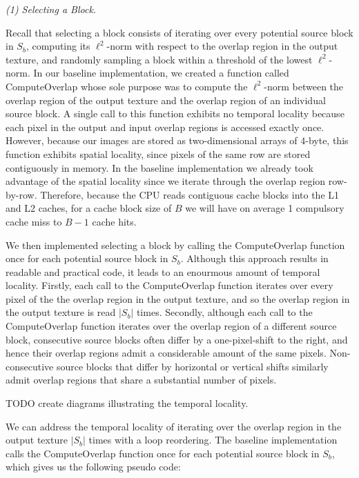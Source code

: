 \documentclass[letterpaper]{article}
\newcommand{\inline}[1]{{\ttfamily\hyphenchar\font=45 #1}}
\begin{document}
\textit{(1) Selecting a Block.}

Recall that selecting a block consists of iterating over every potential source block in $S_b$, computing its $\ell ^2$-norm with respect to the overlap region in the output texture, and randomly sampling a block within a threshold of the lowest $\ell ^2$-norm. In our baseline implementation, we created a function called \inline{ComputeOverlap} whose sole purpose was to compute the $\ell ^2$-norm between the overlap region of the output texture and the overlap region of an individual source block. A single call to this function exhibits no temporal locality because each pixel in the output and input overlap regions is accessed exactly once. However, because our images are stored as two-dimensional arrays of 4-byte, this function exhibits spatial locality, since pixels of the same row are stored contiguously in memory. In the baseline implementation we already took advantage of the spatial locality since we iterate through the overlap region row-by-row. Therefore, because the CPU reads contiguous cache blocks into the L1 and L2 caches, for a cache block size of $B$ we will have on average 1 compulsory cache miss to $B-1$ cache hits.

We then implemented selecting a block by calling the \inline{ComputeOverlap} function once for each potential source block in $S_b$. Although this approach results in readable and practical code, it leads to an enourmous amount of temporal locality. Firstly, each call to the \inline{ComputeOverlap} function iterates over every pixel of the the overlap region in the output texture, and so the overlap region in the output texture is read $|S_b|$ times. Secondly, although each call to the \inline{ComputeOverlap} function iterates over the overlap region of a different source block, consecutive source blocks often differ by a one-pixel-shift to the right, and hence their overlap regions admit a considerable amount of the same pixels. Non-consecutive source blocks that differ by horizontal or vertical shifts similarly admit overlap regions that share a substantial number of pixels.

TODO create diagrams illustrating the temporal locality.

We can address the temporal locality of iterating over the overlap region in the output texture $|S_b|$ times with a loop reordering. The baseline implementation calls the \inline{ComputeOverlap} function once for each potential source block in $S_b$, which gives us the following pseudo code:
\end{document}
